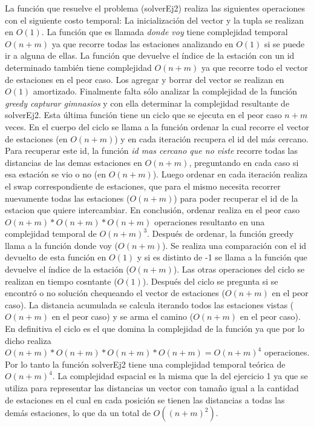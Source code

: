       La función que resuelve el problema (solverEj2) realiza las siguientes operaciones con el siguiente costo temporal: La inicialización del vector y la tupla se realizan en $O(1)$. La función que es llamada \textit{donde voy} tiene complejidad temporal $O(n+m)$ ya que recorre todas las estaciones analizando en $O(1)$ si se puede ir a alguna de ellas. La función que devuelve el índice de la estación con un id determinado también tiene complejidad $O(n+m)$ ya que recorre todo el vector de estaciones en el peor caso. Los agregar y borrar del vector se realizan en $O(1)$ amortizado. Finalmente falta sólo analizar la complejidad de la función \textit{greedy capturar gimnasios} y con ella determinar la complejidad resultante de solverEj2. 
      Esta última función tiene un ciclo que se ejecuta en el peor caso $n+m$ veces. En el cuerpo del ciclo se llama a la función ordenar la cual recorre el vector de estaciones (en $O(n+m)$) y en cada iteración recupera el id del más cercano. Para recuperar este id, la función \textit{id mas cercano que no viste} recorre todas las distancias de las demas estaciones en $O(n+m)$, preguntando en cada caso si esa estación se vio o no (en $O(n+m)$). Luego ordenar en cada iteración realiza el swap correspondiente de estaciones, que para el mismo necesita recorrer nuevamente todas las estaciones ($O(n+m)$) para poder recuperar el id de la estacion que quiere intercambiar. En conclusión, ordenar realiza en el peor caso $O(n+m)*O(n+m)*O(n+m)$ operaciones resultanto en una complejidad temporal de $O(n+m)^3$. 
      Después de ordenar, la función greedy llama a la función donde voy ($O(n+m)$). Se realiza una comparación con el id devuelto de esta función en $O(1)$ y si es distinto de -1 se llama a la función que devuelve el índice de la estación ($O(n+m)$). Las otras operaciones del ciclo se realizan en tiempo cosntante ($O(1)$). 
      Después del ciclo se pregunta si se encontró o no solución chequeando el vector de estaciones ($O(n+m)$ en el peor caso). La distancia acumulada se calcula iterando todos las estaciones vistas ($O(n+m)$ en el peor caso) y se arma el camino ($O(n+m)$ en el peor caso). En definitiva el ciclo es el que domina la complejidad de la función ya que por lo dicho realiza $O(n+m)*O(n+m)*O(n+m)*O(n+m) = O(n+m)^4$ operaciones.
      Por lo tanto la función solverEj2 tiene una complejidad temporal teórica de $O(n+m)^4$. La complejidad espacial es la misma que la del ejercicio 1 ya que se utiliza para representar las distancias un vector con tamaño igual a la cantidad de estaciones en el cual en cada posición se tienen las distancias a todas las demás estaciones, lo que da un total de $O((n+m)^2)$. 

